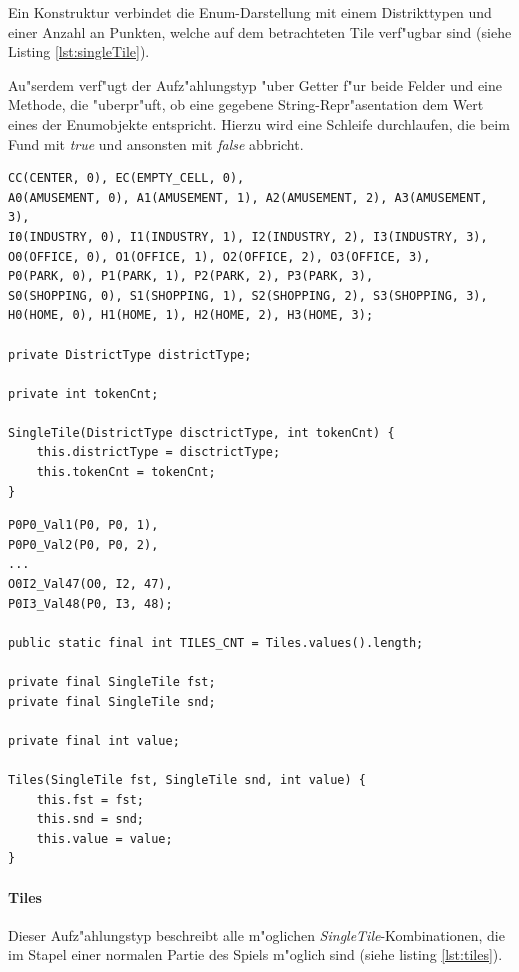 Ein Konstruktur verbindet die Enum-Darstellung mit einem Distrikttypen und einer Anzahl an Punkten, welche auf dem betrachteten Tile verf"ugbar sind (siehe Listing \ref{lst:singleTile}).

Au"serdem verf"ugt der Aufz"ahlungstyp "uber Getter f"ur beide Felder und eine Methode, die "uberpr"uft, ob eine gegebene String-Repr"asentation dem Wert eines der Enumobjekte entspricht. Hierzu wird eine Schleife durchlaufen, die beim Fund mit \emph{true} und ansonsten mit \emph{false} abbricht. 

\begin{lstlisting}[style=CodeHighlighting,float,caption=singleTile,label=lst:singleTile]
CC(CENTER, 0), EC(EMPTY_CELL, 0),
A0(AMUSEMENT, 0), A1(AMUSEMENT, 1), A2(AMUSEMENT, 2), A3(AMUSEMENT, 3),
I0(INDUSTRY, 0), I1(INDUSTRY, 1), I2(INDUSTRY, 2), I3(INDUSTRY, 3),
O0(OFFICE, 0), O1(OFFICE, 1), O2(OFFICE, 2), O3(OFFICE, 3),
P0(PARK, 0), P1(PARK, 1), P2(PARK, 2), P3(PARK, 3),
S0(SHOPPING, 0), S1(SHOPPING, 1), S2(SHOPPING, 2), S3(SHOPPING, 3),
H0(HOME, 0), H1(HOME, 1), H2(HOME, 2), H3(HOME, 3);

private DistrictType districtType;

private int tokenCnt;

SingleTile(DistrictType disctrictType, int tokenCnt) {
    this.districtType = disctrictType;
    this.tokenCnt = tokenCnt;
}
\end{lstlisting}

\begin{lstlisting}[style=CodeHighlighting,float,caption=Tiles,label=lst:tiles]
P0P0_Val1(P0, P0, 1),
P0P0_Val2(P0, P0, 2),
...
O0I2_Val47(O0, I2, 47),
P0I3_Val48(P0, I3, 48);

public static final int TILES_CNT = Tiles.values().length;

private final SingleTile fst;
private final SingleTile snd;

private final int value;

Tiles(SingleTile fst, SingleTile snd, int value) {
    this.fst = fst;
    this.snd = snd;
    this.value = value;
}
\end{lstlisting}

\clearpage
\paragraph{Tiles}
\label{par:tiles}
Dieser Aufz"ahlungstyp beschreibt alle m"oglichen \emph{SingleTile}-Kombinationen, die im Stapel einer normalen Partie des Spiels m"oglich sind (siehe listing \ref{lst:tiles}). 

